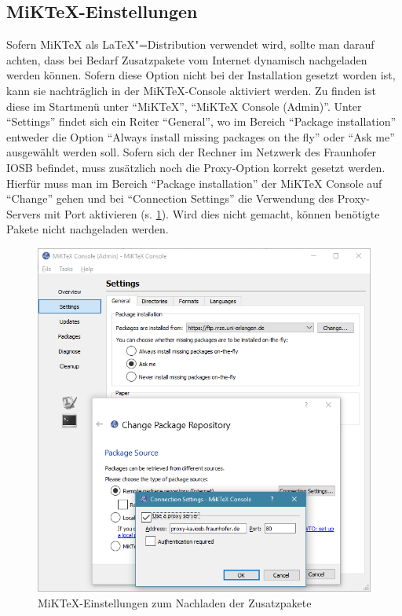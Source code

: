 \subsection{MiKTeX-Einstellungen}
\label{sec:MiKTeX}
Sofern MiKTeX als \LaTeX"=Distribution verwendet wird, sollte man darauf achten, dass bei Bedarf Zusatzpakete vom Internet dynamisch nachgeladen werden können.
Sofern diese Option nicht bei der Installation gesetzt worden ist, kann sie nachträglich in der MiKTeX-Console aktiviert werden.
Zu finden ist diese im Startmenü unter \enquote{MiKTeX}, \enquote{MiKTeX Console (Admin)}.
Unter \enquote{Settings} findet sich ein Reiter \enquote{General}, wo im Bereich \enquote{Package installation} entweder die Option \enquote{Always install missing packages on the fly} oder \enquote{Ask me} ausgewählt werden soll.
Sofern sich der Rechner im Netzwerk des Fraunhofer IOSB befindet, muss zusätzlich noch die Proxy-Option korrekt gesetzt werden.
Hierfür muss man im Bereich \enquote{Package installation} der MiKTeX Console auf \enquote{Change} gehen und bei \enquote{Connection Settings} die Verwendung des Proxy-Servers  mit Port  aktivieren (s. \cref{fig:MiKTeX-Proxy}).
Wird dies nicht gemacht, können benötigte Pakete nicht nachgeladen werden.

\begin{figure}[htb]%
\centering%
\includegraphics[width=\linewidth]{images/examples/MiKTeX-Proxy.png}%
\caption{MiKTeX-Einstellungen zum Nachladen der Zusatzpakete}%
\label{fig:MiKTeX-Proxy}%
\end{figure}


